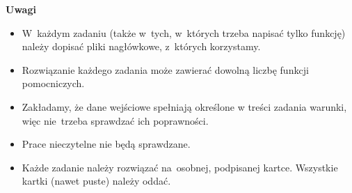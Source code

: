 \documentclass[extrafontsizes,12pt]{article}
\begin{document}
\vfill

\textbf{Uwagi}

\begin{itemize}
\item W~każdym zadaniu (także w~tych, w~których trzeba napisać tylko funkcję) należy dopisać pliki nagłówkowe, z~których korzystamy.
\item Rozwiązanie każdego zadania może zawierać dowolną liczbę funkcji pomocniczych.
\item Zakładamy, że dane wejściowe spełniają określone w treści zadania warunki, więc nie~trzeba sprawdzać ich poprawności.
\item Prace nieczytelne nie będą sprawdzane.
\item Każde zadanie należy rozwiązać na~osobnej, podpisanej kartce. Wszystkie kartki (nawet puste) należy oddać.
\end{itemize}
\end{document}
